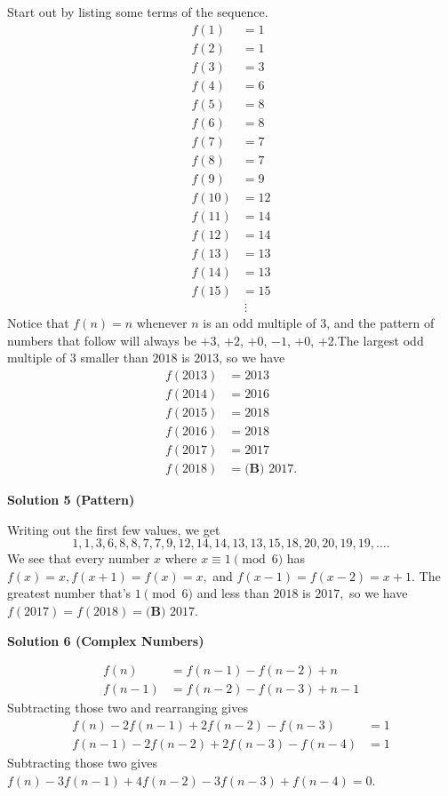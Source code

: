 \begin{enumerate}
Start out by listing some terms of the sequence. 
 \begin{align*} f(1)&=1 \\ f(2)&=1 \\ f(3)&=3 \\ f(4)&=6 \\ f(5)&=8 \\ f(6)&=8 \\  f(7)&=7 \\ f(8)&=7 \\ f(9)&=9 \\ f(10)&=12 \\ f(11)&=14 \\ f(12)&=14 \\ f(13)&=13 \\ f(14)&=13 \\ f(15)&=15 \\ & \ \vdots \end{align*}
Notice that $f(n)=n$ whenever $n$ is an odd multiple of $3$, and the pattern of numbers that follow will always be $+3$, $+2$, $+0$, $-1$, $+0$, $+2$.The largest odd multiple of $3$ smaller than $2018$ is $2013$, so we have
 \begin{align*} f(2013)&=2013 \\ f(2014)&=2016 \\ f(2015)&=2018 \\ f(2016)&=2018 \\ f(2017)&=2017 \\ f(2018)&=\boxed{\textbf{(B) } 2017}. \end{align*}





\textbf{Solution 5 (Pattern)}

Writing out the first few values, we get
 \[1,1,3,6,8,8,7,7,9,12,14,14,13,13,15,18,20,20,19,19,\ldots.\] We see that every number $x$ where $x \equiv 1\pmod 6$ has $f(x)=x,f(x+1)=f(x)=x,$ and $f(x-1)=f(x-2)=x+1.$ The greatest number that's $1\pmod{6}$ and less than $2018$ is $2017,$ so we have $f(2017)=f(2018)=\boxed{\textbf{(B) } 2017}.$




\textbf{Solution 6 (Complex Numbers)}


 \begin{align*} f(n)&=f(n-1)-f(n-2)+n \\ f(n-1)&=f(n-2)-f(n-3)+n-1 \end{align*}
Subtracting those two and rearranging gives 
 \begin{align*} f(n)-2f(n-1)+2f(n-2)-f(n-3)&=1 \\ f(n-1)-2f(n-2)+2f(n-3)-f(n-4)&=1 \end{align*}
Subtracting those two gives $f(n)-3f(n-1)+4f(n-2)-3f(n-3)+f(n-4)=0.$


\end{enumerate}
